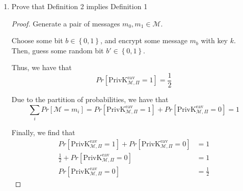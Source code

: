 \documentclass{article}
\begin{document}
\begin{enumerate}
\begin{enumerate}
\begin{proof}
          Due to $\mathcal{M}$ being perfectly secret, we have that
          \[
            Pr[\mathcal{M} = m_0] = Pr[\mathcal{M} = m_1]
          \]

          Due to the partition of probabilities rule, we also find that
          $\sum\limits_{i} Pr[m_i] = 1$, i.e.
          \[
            Pr[\mathcal{M} = m_0] + Pr[\mathcal{M} = m_1] = 1
          \]

          Thus, we have
          \begin{align*}
            Pr[\mathcal{M} = m_0] + Pr[\mathcal{M} = m_1] &= 1\\
            Pr[\mathcal{M} = m_1] + Pr[\mathcal{M} = m_1] &= 1\\
            2Pr[\mathcal{M} = m_1] &= 1\\
            Pr[\mathcal{M} = m_1] &= \frac{1}{2}\\
          \end{align*}
        \end{proof}

      \item Prove that Definition 2 implies Definition 1
        
        \begin{proof}
          Generate a pair of messages $m_0, m_1 \in \mathcal{M}$.

          Choose some bit $b \in \left\{0, 1\right\}$, and encrypt some message
          $m_b$ with key $k$. Then, guess some random bit 
          $b' \in \left\{0, 1\right\}$.

          Thus, we have that
          \[
            Pr[\text{PrivK}_{\mathcal{M}, \Pi}^{\text{eav}} = 1] = \frac{1}{2}
          \]

          Due to the partition of probabilities, we have that
          \[
            \sum\limits_i Pr[\mathcal{M} = m_i] =  
            Pr[\text{PrivK}_{\mathcal{M}, \Pi}^{\text{eav}} = 1] + 
            Pr[\text{PrivK}_{\mathcal{M}, \Pi}^{\text{eav}} = 0] = 1
          \]

          Finally, we find that
          \begin{align*}
            Pr[\text{PrivK}_{\mathcal{M}, \Pi}^{\text{eav}} = 1] + 
            Pr[\text{PrivK}_{\mathcal{M}, \Pi}^{\text{eav}} = 0] &= 1\\
            \frac{1}{2} + Pr[\text{PrivK}_{\mathcal{M}, \Pi}^{\text{eav}} = 0] &= 1\\
            Pr[\text{PrivK}_{\mathcal{M}, \Pi}^{\text{eav}} = 0] &= \frac{1}{2}
          \end{align*}


\end{proof}
\end{enumerate}
\end{enumerate}
\end{document}
